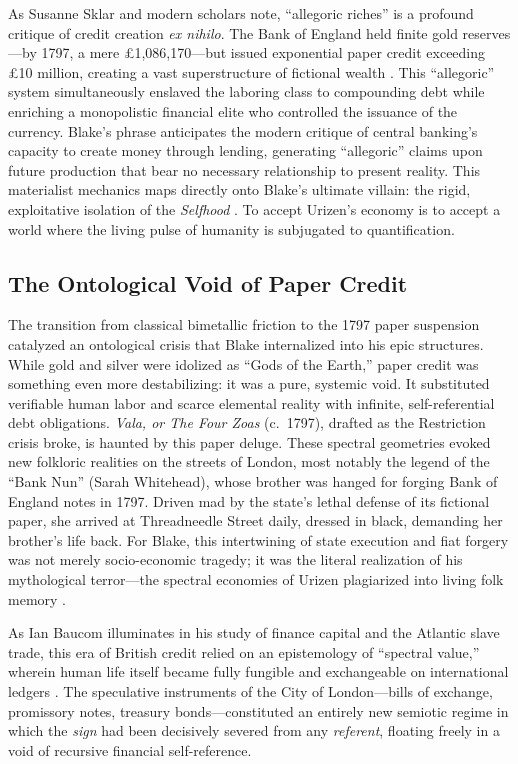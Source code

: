 \documentclass[
]{article}
\begin{document}
As Susanne Sklar and modern scholars note, ``allegoric riches'' is a
profound critique of credit creation \emph{ex nihilo}. The Bank of
England held finite gold reserves---by 1797, a mere £1,086,170---but
issued exponential paper credit exceeding £10 million, creating a vast
superstructure of fictional wealth \citep{clapham1944bank}. This
``allegoric'' system simultaneously enslaved the laboring class to
compounding debt while enriching a monopolistic financial elite who
controlled the issuance of the currency. Blake's phrase anticipates the
modern critique of central banking's capacity to create money through
lending, generating ``allegoric'' claims upon future production that
bear no necessary relationship to present reality. This materialist
mechanics maps directly onto Blake's ultimate villain: the rigid,
exploitative isolation of the \emph{Selfhood}
\citep{schouten2020epicurean}. To accept Urizen's economy is to accept a
world where the living pulse of humanity is subjugated to
quantification.

\subsection{The Ontological Void of Paper
Credit}\label{the-ontological-void-of-paper-credit}

The transition from classical bimetallic friction to the 1797 paper
suspension catalyzed an ontological crisis that Blake internalized into
his epic structures. While gold and silver were idolized as ``Gods of
the Earth,'' paper credit was something even more destabilizing: it was
a pure, systemic void. It substituted verifiable human labor and scarce
elemental reality with infinite, self-referential debt obligations.
\emph{Vala, or The Four Zoas} (c.~1797), drafted as the Restriction
crisis broke, is haunted by this paper deluge. These spectral geometries
evoked new folkloric realities on the streets of London, most notably
the legend of the ``Bank Nun'' (Sarah Whitehead), whose brother was
hanged for forging Bank of England notes in 1797. Driven mad by the
state's lethal defense of its fictional paper, she arrived at
Threadneedle Street daily, dressed in black, demanding her brother's
life back. For Blake, this intertwining of state execution and fiat
forgery was not merely socio-economic tragedy; it was the literal
realization of his mythological terror---the spectral economies of
Urizen plagiarized into living folk memory \citep{makdisi2003william}.

As Ian Baucom illuminates in his study of finance capital and the
Atlantic slave trade, this era of British credit relied on an
epistemology of ``spectral value,'' wherein human life itself became
fully fungible and exchangeable on international ledgers
\citep{baucom2005specters}. The speculative instruments of the City of
London---bills of exchange, promissory notes, treasury
bonds---constituted an entirely new semiotic regime in which the
\emph{sign} had been decisively severed from any \emph{referent},
floating freely in a void of recursive financial self-reference.
\end{document}
